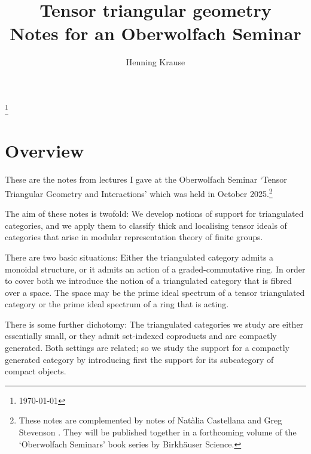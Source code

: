 \documentclass{amsart}[a4]
\theoremstyle{definition}
\theoremstyle{remark}
\numberwithin{equation}{section}
\begin{document}
\title{Tensor triangular geometry\\
 Notes for an Oberwolfach Seminar}

\author{Henning Krause}
\address{Fakult\"at f\"ur Mathematik\\
Universit\"at Bielefeld\\ D-33501 Bielefeld\\ Germany}

\thanks{\today}

\maketitle

\setcounter{tocdepth}{1} 
\tableofcontents


\section*{Overview}

These are the notes from lectures I gave at the Oberwolfach Seminar
‘Tensor Triangular Geometry and Interactions’ which was held in
October 2025.\footnote{These notes are complemented by notes of
  Nat\`alia Castellana and Greg Stevenson \cite{Stevenson:2026a}. They will be published
  together in a forthcoming volume of the `Oberwolfach Seminars' book
  series by Birkhäuser Science.}

The aim of these notes is twofold: We develop notions of support for
triangulated categories, and we apply them to classify thick and
localising tensor ideals of categories that arise in modular
representation theory of finite groups.

There are two basic situations: Either the triangulated category
admits a monoidal structure, or it admits an action of a
graded-commutative ring. In order to cover both we introduce the
notion of a triangulated category that is fibred over a space. The space may
be the prime ideal spectrum of a tensor triangulated category or the
prime ideal spectrum of a ring that is acting.

There is some further dichotomy: The triangulated categories we study
are either essentially small, or they admit set-indexed coproducts and
are compactly generated. Both settings are related; so we study the
support for a compactly generated category by introducing first the
support for its subcategory of compact objects.
\end{document}
